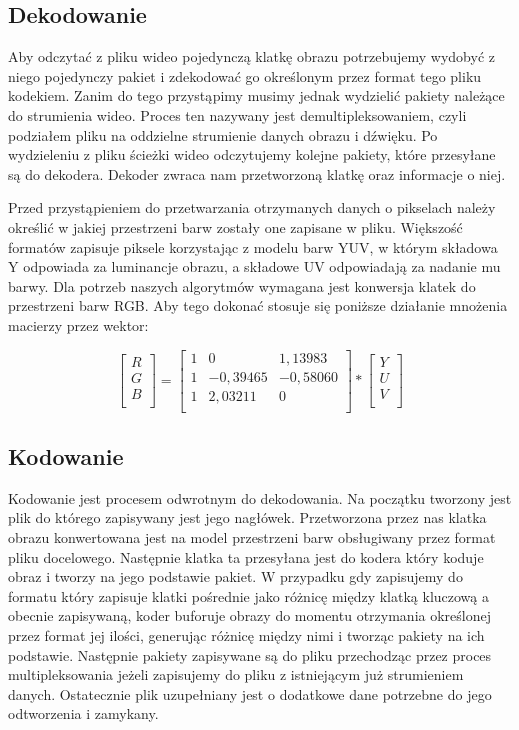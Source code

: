 \documentclass[twoside]{projektInzynierskiMS}
\begin{document}
\subsection{Dekodowanie}
Aby odczytać z pliku wideo pojedynczą klatkę obrazu potrzebujemy wydobyć z niego pojedynczy pakiet i zdekodować go określonym przez format tego pliku kodekiem. Zanim do tego przystąpimy musimy jednak wydzielić pakiety należące do strumienia wideo. Proces ten nazywany jest demultipleksowaniem, czyli podziałem pliku na oddzielne strumienie danych obrazu i dźwięku. Po wydzieleniu z pliku ścieżki wideo odczytujemy kolejne pakiety, które przesyłane są do dekodera. Dekoder zwraca nam przetworzoną klatkę oraz informacje o niej. 

Przed przystąpieniem do przetwarzania otrzymanych danych o pikselach należy określić w jakiej przestrzeni barw zostały one zapisane w pliku. Większość formatów zapisuje piksele korzystając z modelu barw YUV, w którym składowa Y odpowiada za luminancje obrazu, a składowe UV odpowiadają za nadanie mu barwy. Dla potrzeb naszych algorytmów wymagana jest konwersja klatek do przestrzeni barw RGB. Aby tego dokonać stosuje się poniższe działanie mnożenia macierzy przez wektor:

\[
\begin{bmatrix}
	R\\[0.3em]
	G\\[0.3em]
	B\\[0.3em]
\end{bmatrix}
=
\begin{bmatrix}
	1 & 0 & 1,13983\\[0.3em]
	1 & -0,39465 & -0,58060\\[0.3em]
	1 & 2,03211 & 0\\[0.3em]
\end{bmatrix}
*
\begin{bmatrix}
Y\\[0.3em]
U\\[0.3em]
V\\[0.3em]
\end{bmatrix}
\]
\subsection{Kodowanie}
Kodowanie jest procesem odwrotnym do dekodowania. Na początku tworzony jest plik do którego zapisywany jest jego nagłówek. Przetworzona przez nas klatka obrazu konwertowana jest na model przestrzeni barw obsługiwany przez format pliku docelowego. Następnie klatka ta przesyłana jest do kodera który koduje obraz i tworzy na jego podstawie pakiet. W przypadku gdy zapisujemy do formatu który zapisuje klatki pośrednie jako różnicę między klatką kluczową a obecnie zapisywaną, koder buforuje obrazy do momentu otrzymania określonej przez format jej ilości, generując różnicę między nimi i tworząc pakiety na ich podstawie. Następnie pakiety zapisywane są do pliku przechodząc przez proces multipleksowania jeżeli zapisujemy do pliku z istniejącym już strumieniem danych. Ostatecznie plik uzupełniany jest o dodatkowe dane potrzebne do jego odtworzenia i zamykany.
\end{document}

